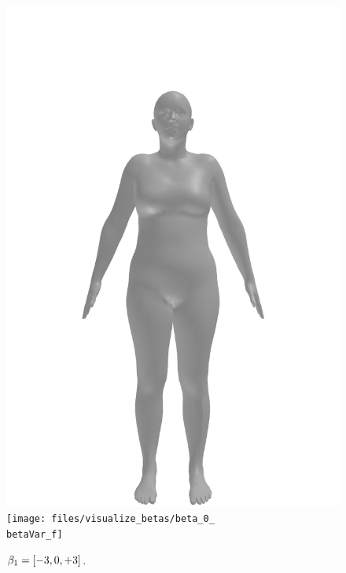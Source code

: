 \begin{figure}[ht!]
\begin{minipage}[b]{\textwidth}
        \includegraphics[width=\imgWidth]{files/visualize_betas/baseline_f}
        \texttt{[image: files/visualize\_betas/beta\_0\_\\betaVar\_f]}
        \caption[Effect of varying $\beta_1$ in SMPL.]{$\beta_1 = [-3, 0, +3]$.}
        \label{fig:beta-1-vis}
    \end{minipage}
\end{figure}


